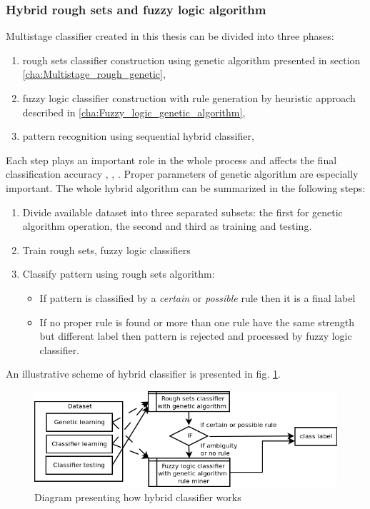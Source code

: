 \subsubsection{Hybrid rough sets and fuzzy logic algorithm}
\label{cha:Multistage_rough_fuzzy}
Multistage classifier created in this thesis can be divided into three phases:
\begin{enumerate}
    \item rough sets classifier construction using genetic algorithm presented
        in section \ref{cha:Multistage_rough_genetic},
    \item fuzzy logic classifier construction with rule generation by heuristic
        approach described in \ref{cha:Fuzzy_logic_genetic_algorithm},
    \item pattern recognition using sequential hybrid classifier,
\end{enumerate}
Each step plays an important role in the whole process and affects the final
classification accuracy \cite{bib12}, \cite{bib27}, \cite{bib32}. Proper parameters of genetic algorithm are especially
important. The whole hybrid algorithm can be summarized in the following steps:
\begin{enumerate}
    \item Divide available dataset into three separated subsets: the first for
        genetic algorithm operation, the second and third as training and
        testing.
    \item Train rough sets, fuzzy logic classifiers
    \item Classify pattern using rough sets algorithm:
        \begin{itemize}
            \item If pattern is classified by a \textit{certain} or
                \textit{possible} rule then it is a final label
            \item If no proper rule is found or more than one rule have the same
                strength but different label then pattern is rejected and
                processed by fuzzy logic classifier.
        \end{itemize}
\end{enumerate}
An illustrative scheme of hybrid classifier is presented in fig. \ref{fig:schematic}.
\begin{figure}[H]
    \begin{center}
        \includegraphics[width=\textwidth]{fig/diagram.png}
    \end{center}
    \caption{Diagram presenting how hybrid classifier works}
    \label{fig:schematic}
\end{figure}
